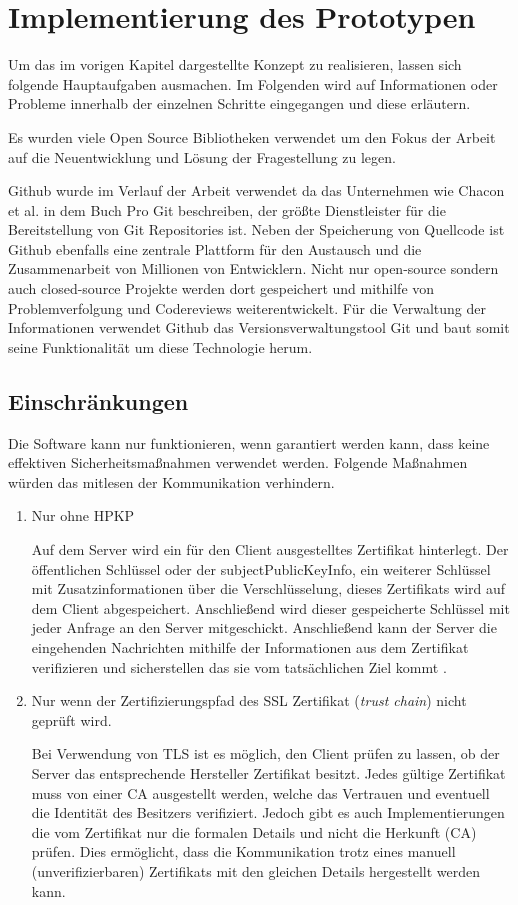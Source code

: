 \chapter{Implementierung des Prototypen}

Um das im vorigen Kapitel dargestellte Konzept zu realisieren, lassen sich folgende Hauptaufgaben ausmachen. Im Folgenden wird auf Informationen oder Probleme innerhalb der einzelnen Schritte eingegangen und diese erläutern.

Es wurden viele Open Source Bibliotheken verwendet um den Fokus der Arbeit auf die Neuentwicklung und Lösung der Fragestellung zu legen.

Github wurde im Verlauf der Arbeit verwendet da das Unternehmen wie Chacon et al. in dem Buch Pro Git \cite{Chacon2014} beschreiben, der größte Dienstleister für die Bereitstellung von Git Repositories ist. Neben der Speicherung von Quellcode ist Github ebenfalls eine zentrale Plattform für den Austausch und die Zusammenarbeit von Millionen von Entwicklern. Nicht nur open-source sondern auch closed-source Projekte werden dort gespeichert und mithilfe von Problemverfolgung und Codereviews weiterentwickelt. Für die Verwaltung der Informationen verwendet Github das Versionsverwaltungstool Git und baut somit seine Funktionalität um diese Technologie herum.

\section{Einschränkungen}
Die Software kann nur funktionieren, wenn garantiert werden kann, dass keine effektiven Sicherheitsmaßnahmen verwendet werden. Folgende Maßnahmen würden das mitlesen der Kommunikation verhindern.
\begin{enumerate}
    \item Nur ohne \ac{HPKP}
    
    Auf dem Server wird ein für den Client ausgestelltes Zertifikat hinterlegt. Der öffentlichen Schlüssel oder der \glqq subjectPublicKeyInfo\grqq{}, ein weiterer Schlüssel mit Zusatzinformationen über die Verschlüsselung, dieses Zertifikats wird auf dem Client abgespeichert. Anschließend wird dieser gespeicherte Schlüssel mit jeder Anfrage an den Server mitgeschickt. Anschließend kann der Server die eingehenden Nachrichten mithilfe der Informationen aus dem Zertifikat verifizieren und sicherstellen das sie vom tatsächlichen Ziel kommt \cite{evans_palmer_sleevi_2015}.
    \item Nur wenn der Zertifizierungspfad des SSL Zertifikat (\emph{trust chain}) nicht geprüft wird.
    
    Bei Verwendung von TLS ist es möglich, den Client prüfen zu lassen, ob der Server das entsprechende Hersteller Zertifikat besitzt. Jedes gültige Zertifikat muss von einer \ac{CA} ausgestellt werden, welche das Vertrauen und eventuell die Identität des Besitzers verifiziert. Jedoch gibt es auch Implementierungen die vom Zertifikat nur die formalen Details und nicht die Herkunft (CA) prüfen.
    Dies ermöglicht, dass die Kommunikation trotz eines manuell (unverifizierbaren) Zertifikats mit den gleichen Details hergestellt werden kann.
\end{enumerate}


